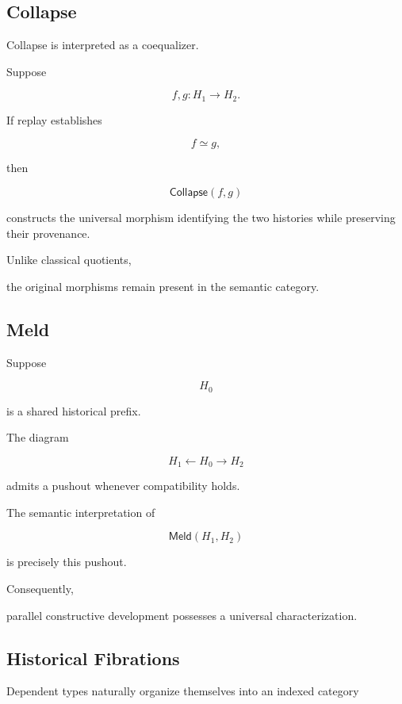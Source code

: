 \documentclass[12pt,oneside]{article}
\theoremstyle{definition}
\theoremstyle{remark}
\newcommand{\Collapse}{\mathsf{Collapse}}
\newcommand{\Meld}{\mathsf{Meld}}
\begin{document}

\subsection{Collapse}

Collapse is interpreted as a coequalizer.

Suppose

\[
f,g
:
H_1
\rightarrow
H_2.
\]

If replay establishes

\[
f
\simeq
g,
\]

then

\[
\Collapse(f,g)
\]

constructs the universal morphism identifying the two histories while preserving
their provenance.

Unlike classical quotients,

the original morphisms remain present in the semantic category.


\subsection{Meld}

Suppose

\[
H_0
\]

is a shared historical prefix.

The diagram

\[
H_1
\leftarrow
H_0
\rightarrow
H_2
\]

admits a pushout whenever compatibility holds.

The semantic interpretation of

\[
\Meld(H_1,H_2)
\]

is precisely this pushout.

Consequently,

parallel constructive development possesses a universal characterization.


\subsection{Historical Fibrations}

Dependent types naturally organize themselves into an indexed category
\end{document}
